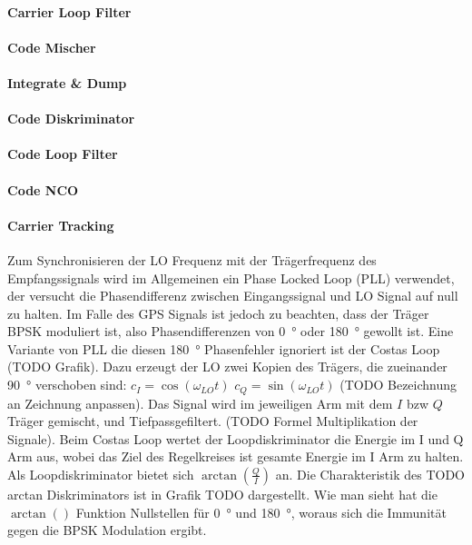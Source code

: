 \paragraph{Carrier Loop Filter}


\paragraph{Code Mischer}
\paragraph{Integrate \& Dump}
\paragraph{Code Diskriminator}
\paragraph{Code Loop Filter}
\paragraph{Code NCO}


\paragraph{Carrier Tracking}
Zum Synchronisieren der LO Frequenz mit der Trägerfrequenz des Empfangssignals wird im Allgemeinen ein Phase Locked Loop (PLL) verwendet, der versucht die Phasendifferenz zwischen Eingangssignal und LO Signal auf null zu halten. Im Falle des GPS Signals ist jedoch zu beachten, dass der Träger BPSK moduliert ist, also Phasendifferenzen von \SI{0}{\degree} oder \SI{180}{\degree} gewollt ist. Eine Variante von PLL die diesen \SI{180}{\degree} Phasenfehler ignoriert ist der Costas Loop (TODO Grafik).
Dazu erzeugt der LO zwei Kopien des Trägers, die zueinander \SI{90}{\degree} verschoben sind: $c_I=\cos(\omega_{LO} t)$ $c_Q=\sin(\omega_{LO} t)$ (TODO Bezeichnung an Zeichnung anpassen). Das Signal wird im jeweiligen Arm mit dem $I$ bzw $Q$ Träger gemischt, und Tiefpassgefiltert. (TODO Formel Multiplikation der Signale). Beim Costas Loop wertet der Loopdiskriminator die Energie im I und Q Arm aus, wobei das Ziel des Regelkreises ist gesamte Energie im I Arm zu halten. Als Loopdiskriminator bietet sich $\arctan\left(\frac{Q}{I}\right)$ an. Die Charakteristik des TODO arctan Diskriminators ist in Grafik TODO dargestellt. Wie man sieht hat die $\arctan()$ Funktion Nullstellen für \SI{0}{\degree} und \SI{180}{\degree}, woraus sich die Immunität gegen die BPSK Modulation ergibt.

